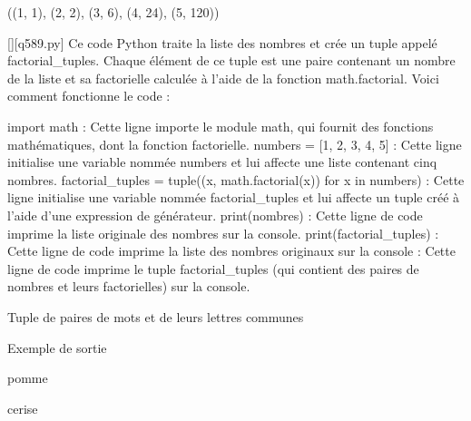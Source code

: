 ((1, 1), (2, 2), (3, 6), (4, 24), (5, 120))
        \par
        \begin{solution}
            \renewcommand{\nomfichier}{q589.py}
            \pythonfile{\chemincode \nomfichier}[][\nomfichier]
            Ce code Python traite la liste des nombres et crée un tuple appelé factorial\_tuples. Chaque élément de ce tuple est une paire contenant un nombre de la liste et sa factorielle calculée à l'aide de la fonction math.factorial. Voici comment fonctionne le code :

    import math : Cette ligne importe le module math, qui fournit des fonctions mathématiques, dont la fonction factorielle.
    numbers = [1, 2, 3, 4, 5] : Cette ligne initialise une variable nommée numbers et lui affecte une liste contenant cinq nombres.
    factorial\_tuples = tuple((x, math.factorial(x)) for x in numbers) : Cette ligne initialise une variable nommée factorial\_tuples et lui affecte un tuple créé à l'aide d'une expression de générateur.
    print(nombres) : Cette ligne de code imprime la liste originale des nombres sur la console.
    print(factorial\_tuples) : Cette ligne de code imprime la liste des nombres originaux sur la console : Cette ligne de code imprime le tuple factorial\_tuples (qui contient des paires de nombres et leurs factorielles) sur la console.
        \end{solution}
        

        \question
        Tuple de paires de mots et de leurs lettres communes

Exemple de sortie

pomme

cerise

